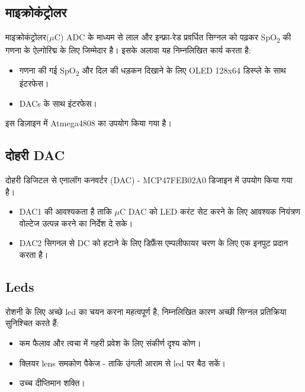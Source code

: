	\pagebreak
	
	\subsection{माइक्रोकंट्रोलर}
	
		माइक्रोकंट्रोलर($\mu$C) ADC के माध्यम से लाल और इन्फ्रा-रेड प्रवर्धित सिग्नल को पढ़कर SpO\textsubscript{2} की गणना के ऐल्गोरिद्म के लिए जिम्मेदार है। इसके अलावा यह निम्नलिखित कार्य करता है:
		
		\begin{itemize}
			\item गणना की गई SpO\textsubscript{2} और दिल की धड़कन दिखाने के लिए OLED 128x64 डिस्प्ले के साथ इंटरफेस।
			
			\item DACs के साथ इंटरफेस। 
			
		\end{itemize}
		
		इस डिज़ाइन में Atmega4808 का उपयोग किया गया है।
	
	\subsection{दोहरी DAC}
	

		दोहरी डिजिटल से एनालॉग कनवर्टर (DAC) - MCP47FEB02A0 डिजाइन में उपयोग किया गया है।
		
		\begin{itemize}
			
			\item DAC1 की आवश्यकता है ताकि $\mu$C DAC को LED करंट सेट करने के लिए आवश्यक नियंत्रण वोल्टेज उत्पन्न करने का निर्देश दे सके।
			
			\item DAC2 सिगनल से DC को हटाने के लिए डिफ़ैंस एम्पलीफायर चरण के लिए एक इनपुट प्रदान करता है।
		
		\end{itemize}
	
	\subsection{Leds}
		रोशनी के लिए अच्छे led का चयन करना महत्वपूर्ण है, निम्नलिखित कारण अच्छी सिग्नल प्रतिक्रिया सुनिश्चित करते हैं:
				
		\begin{itemize}
			\item कम फैलाव और त्वचा में गहरी प्रवेश के लिए संकीर्ण दृश्य कोण। 
			\item क्लियर lens समकोण पैकेज - ताकि उंगली आराम से led पर बैठ सकें। 
			\item उच्च दीप्तिमान शक्ति। 
		\end{itemize}
		
